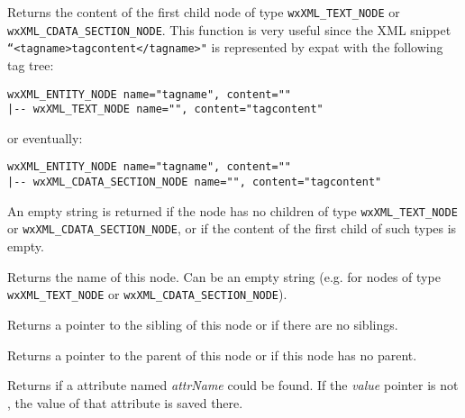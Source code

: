 \label{wxxmlnodegetnodecontent}


Returns the content of the first child node of type \texttt{wxXML\_TEXT\_NODE} or \texttt{wxXML\_CDATA\_SECTION\_NODE}.
This function is very useful since the XML snippet \texttt{``<tagname>tagcontent</tagname>"} is represented by
expat with the following tag tree:

\begin{verbatim}
wxXML_ENTITY_NODE name="tagname", content=""
|-- wxXML_TEXT_NODE name="", content="tagcontent"
\end{verbatim}

or eventually:

\begin{verbatim}
wxXML_ENTITY_NODE name="tagname", content=""
|-- wxXML_CDATA_SECTION_NODE name="", content="tagcontent"
\end{verbatim}

An empty string is returned if the node has no children of type \texttt{wxXML\_TEXT\_NODE} or \texttt{wxXML\_CDATA\_SECTION\_NODE}, or if the content of the first child of such types is empty.


\label{wxxmlnodegetname}


Returns the name of this node. Can be an empty string (e.g. for nodes of type {\tt wxXML\_TEXT\_NODE} or {\tt wxXML\_CDATA\_SECTION\_NODE}).

\label{wxxmlnodegetnext}


Returns a pointer to the sibling of this node or \NULL if there are no siblings.

\label{wxxmlnodegetparent}


Returns a pointer to the parent of this node or \NULL if this node has no parent.

\label{wxxmlnodegetattribute}


Returns \true if a attribute named {\it attrName} could be found.
If the {\it value} pointer is not \NULL, the value of that attribute is saved there.

